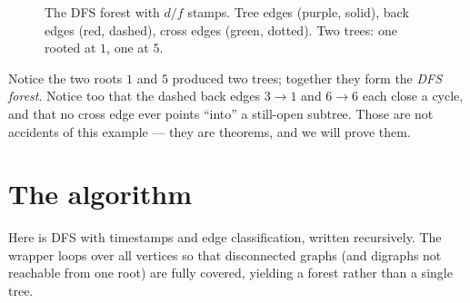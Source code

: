 \begin{figure}[H]
\centering
{}
\caption{The DFS forest with $d/f$ stamps. Tree edges (purple, solid), back edges (red, dashed), cross edges (green, dotted). Two trees: one rooted at $1$, one at $5$.}
\label{ch03:fig-forest}
\end{figure}

Notice the two roots $1$ and $5$ produced two trees; together they form the \emph{DFS forest}. Notice too that the dashed back edges $3\to1$ and $6\to6$ each close a cycle, and that no cross edge ever points ``into'' a still-open subtree. Those are not accidents of this example --- they are theorems, and we will prove them.

\section{The algorithm}
\label{ch03:algorithm}

Here is DFS with timestamps and edge classification, written recursively. The wrapper loops over all vertices so that disconnected graphs (and digraphs not reachable from one root) are fully covered, yielding a forest rather than a single tree.


